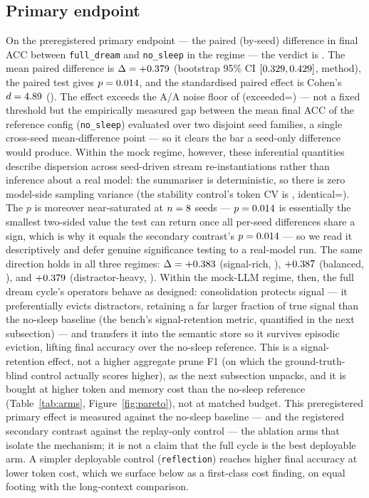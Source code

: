 \subsection{Primary endpoint}
On the preregistered primary endpoint --- the paired (by-seed) difference in
final ACC between \texttt{full\_dream} and \texttt{no\_sleep} in the
\SWprimaryRegime{} regime --- the verdict is \textbf{\SWprimaryVerdict}. The mean
paired difference is $\Delta=+0.379$ (bootstrap 95\% CI
$[0.329,0.429]$, \SWprimaryCImethod{} method), the paired
\SWprimaryTest{} test gives $p=0.014$, and the standardised paired effect
is Cohen's $d=4.89$ (\SWprimaryEffectMag). The effect exceeds the A/A
noise floor of \SWnoiseFloor{} (exceeded=\SWexceedsNoiseFloor) --- not a fixed
threshold but the empirically measured gap between the mean final ACC of the
reference config (\texttt{no\_sleep}) evaluated over two disjoint seed families, a
single cross-seed mean-difference point --- so it clears the bar a seed-only
difference would produce. Within the mock regime, however, these inferential
quantities describe dispersion across seed-driven stream re-instantiations rather
than inference about a real model: the summariser is deterministic, so there is
zero model-side sampling variance (the stability control's token CV is
\SWstabilityCV, identical=\SWstabilityIdentical). The \SWprimaryTest{} $p$ is
moreover near-saturated at $n=8$ seeds --- $p=0.014$ is essentially
the smallest two-sided value the test can return once all \SWnSeeds{} per-seed
differences share a sign, which is why it equals the secondary contrast's
$p=0.014$ --- so we read it descriptively and defer genuine
significance testing to a real-model run. The same direction holds in all three
regimes: $\Delta=+0.383$ (signal-rich, \SWverdictSignalRich),
$+0.387$ (balanced, \SWverdictBalanced), and $+0.379$
(distractor-heavy, \SWverdictDistractorHeavy). Within the mock-LLM regime, then,
the full dream cycle's operators behave as designed: consolidation protects
signal --- it preferentially evicts distractors, retaining a far larger fraction
of true signal than the no-sleep baseline (the bench's signal-retention metric,
quantified in the next subsection) --- and transfers it into the semantic store so
it survives episodic eviction, lifting final accuracy over the no-sleep reference. This is a signal-retention effect, not
a higher aggregate prune F1 (on which the ground-truth-blind control actually
scores higher), as the next subsection unpacks, and it is bought at higher token
and memory cost than the no-sleep reference (Table~\ref{tab:arms},
Figure~\ref{fig:pareto}), not at matched budget. This preregistered primary effect
is measured against the no-sleep baseline --- and the registered secondary
contrast against the replay-only control --- the ablation arms that isolate the
mechanism; it is not a claim that the full cycle is the best deployable arm. A
simpler deployable control (\texttt{reflection}) reaches higher final accuracy at
lower token cost, which we surface below as a first-class cost finding, on equal
footing with the long-context comparison.

